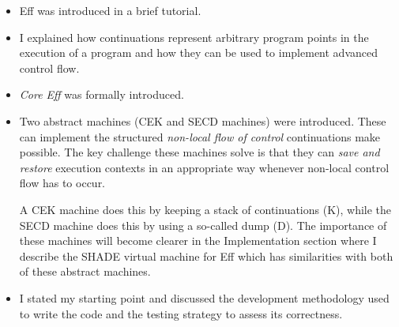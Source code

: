 \documentclass[class=article, crop=false]{standalone}
\begin{document}
\begin{itemize}
\item Eff was introduced in a brief tutorial.
\item I explained how continuations represent arbitrary program points in the
execution of a program and how they can be used to implement advanced control flow.
\item \emph{Core Eff} was formally introduced.

\item Two abstract machines (CEK and SECD machines) were introduced.
    These can implement the structured \emph{non-local flow of control}
    continuations make possible. The key challenge these machines solve is that
    they can \emph{save and restore} execution contexts in an appropriate way
    whenever non-local control flow has to occur.

    A CEK machine does this by keeping a stack of continuations (K), while the
    SECD machine does this by using a so-called dump (D). The importance of
    these machines will become clearer in the Implementation section where I
    describe the SHADE virtual machine for Eff which has similarities with both
    of these abstract machines.

\item I stated my starting point and discussed the development methodology
    used to write the code and the testing strategy to assess its correctness.
\end{itemize}

\ifstandalone
{}

\fi
\end{document}

